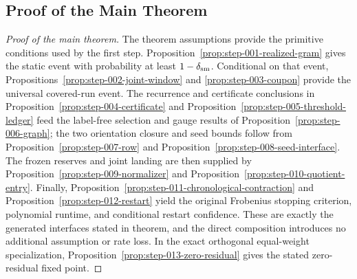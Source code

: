 \subsection{Proof of the Main Theorem}\label{app:main-proof}
\begin{proof}[Proof of the main theorem]
The theorem assumptions provide the primitive conditions used by the
first step.  Proposition~\ref{prop:step-001-realized-gram} gives the static event
with probability at least $1-\delta_{\rm sm}$.  Conditional on that event,
Propositions~\ref{prop:step-002-joint-window} and
\ref{prop:step-003-coupon} provide the universal covered-run event.  The
recurrence and certificate conclusions in Proposition~\ref{prop:step-004-certificate}
and Proposition~\ref{prop:step-005-threshold-ledger} feed the label-free selection
and gauge results of Proposition~\ref{prop:step-006-graph}; the two
orientation closure and seed bounds follow from Proposition~\ref{prop:step-007-row}
and Proposition~\ref{prop:step-008-seed-interface}.  The frozen reserves and
joint landing are then supplied by Proposition~\ref{prop:step-009-normalizer}
and Proposition~\ref{prop:step-010-quotient-entry}.  Finally,
Proposition~\ref{prop:step-011-chronological-contraction} and
Proposition~\ref{prop:step-012-restart} yield the original Frobenius stopping
criterion, polynomial runtime, and conditional restart confidence.  These are
exactly the generated interfaces stated in theorem, and the direct
composition introduces no additional assumption or rate loss.  In the exact
orthogonal equal-weight specialization, Proposition~\ref{prop:step-013-zero-residual}
gives the stated zero-residual fixed point.
\end{proof}
